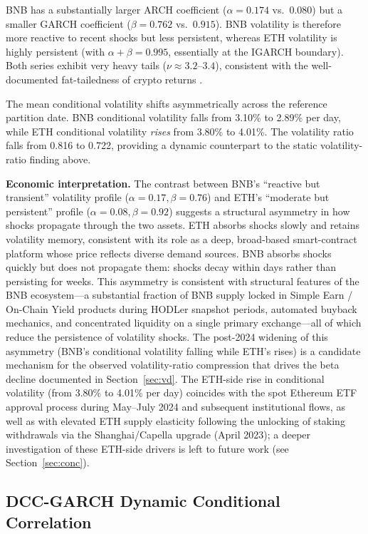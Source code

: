 \documentclass[11pt,a4paper]{article}
\begin{document}
BNB has a substantially larger ARCH coefficient ($\alpha=0.174$ vs.\ $0.080$) but a smaller GARCH coefficient ($\beta=0.762$ vs.\ $0.915$). BNB volatility is therefore more reactive to recent shocks but less persistent, whereas ETH volatility is highly persistent (with $\alpha + \beta = 0.995$, essentially at the IGARCH boundary). Both series exhibit very heavy tails ($\nu \approx 3.2$--$3.4$), consistent with the well-documented fat-tailedness of crypto returns \citep{borri2019,baur2018,dyhrberg2016}.

The mean conditional volatility shifts asymmetrically across the reference partition date. BNB conditional volatility falls from 3.10\% to 2.89\% per day, while ETH conditional volatility \emph{rises} from 3.80\% to 4.01\%. The volatility ratio falls from 0.816 to 0.722, providing a dynamic counterpart to the static volatility-ratio finding above.

\textbf{Economic interpretation.} The contrast between BNB's ``reactive but transient'' volatility profile ($\alpha = 0.17, \beta = 0.76$) and ETH's ``moderate but persistent'' profile ($\alpha = 0.08, \beta = 0.92$) suggests a structural asymmetry in how shocks propagate through the two assets. ETH absorbs shocks slowly and retains volatility memory, consistent with its role as a deep, broad-based smart-contract platform whose price reflects diverse demand sources. BNB absorbs shocks quickly but does not propagate them: shocks decay within days rather than persisting for weeks. This asymmetry is consistent with structural features of the BNB ecosystem---a substantial fraction of BNB supply locked in Simple Earn / On-Chain Yield products during HODLer snapshot periods, automated buyback mechanics, and concentrated liquidity on a single primary exchange---all of which reduce the persistence of volatility shocks. The post-2024 widening of this asymmetry (BNB's conditional volatility falling while ETH's rises) is a candidate mechanism for the observed volatility-ratio compression that drives the beta decline documented in Section~\ref{sec:vd}. The ETH-side rise in conditional volatility (from 3.80\% to 4.01\% per day) coincides with the spot Ethereum ETF approval process during May--July 2024 and subsequent institutional flows, as well as with elevated ETH supply elasticity following the unlocking of staking withdrawals via the Shanghai/Capella upgrade (April 2023); a deeper investigation of these ETH-side drivers is left to future work (see Section~\ref{sec:conc}).

\subsection{DCC-GARCH Dynamic Conditional Correlation} \label{sec:dcc}
\end{document}
